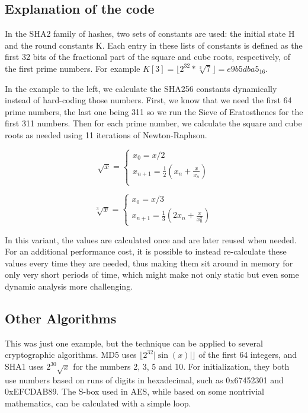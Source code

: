 \documentclass[twocolumn]{article}
\begin{document}
\subsection*{Explanation of the code}

In the SHA2 family of hashes, two sets of constants are used: the initial state H and the round constants K. Each entry in these lists of constants is defined as the first 32 bits of the fractional part of the square and cube roots, respectively, of the first prime numbers. For example $K[3] = \lfloor 2^{32}*\sqrt[3]{7} \rfloor = e9b5dba5_{16} $.

In the example to the left, we calculate the SHA256 constants dynamically instead of hard-coding those numbers. First, we know that we need the first 64 prime numbers, the last one being 311 so we run the Sieve of Eratosthenes for the first 311 numbers. Then for each prime number, we calculate the square and cube roots as needed using 11 iterations of Newton-Raphson.

$$
\sqrt{x} = \begin{cases}
x_0 = x/2\\
x_{n+1} = \frac{1}{2}\left(x_n + \frac{x}{x_n}\right)\\
\end{cases}
$$

$$
\sqrt[3]{x} = \begin{cases}
x_0 = x/3\\
x_{n+1} = \frac{1}{3}\left(2x_n + \frac{x}{x_n^2}\right)
\end{cases}
$$

In this variant, the values are calculated once and are later reused when needed. For an additional performance cost, it is possible to instead re-calculate these values every time they are needed, thus making them sit around in memory for only very short periods of time, which might make not only static but even some dynamic analysis more challenging.

\vspace*{-0.5\baselineskip}
\subsection*{Other Algorithms}

This was just one example, but the technique can be applied to several cryptographic algorithms. MD5 uses $ \lfloor2^{32}|\sin(x)|\rfloor $ of the first 64 integers, and SHA1 uses $ 2^{30}\sqrt{x} $ for the numbers 2, 3, 5 and 10. For initialization, they both use numbers based on runs of digits in hexadecimal, such as 0x67452301 and 0xEFCDAB89. The S-box used in AES, while based on some nontrivial mathematics, can be calculated with a simple loop. 
\end{document}
